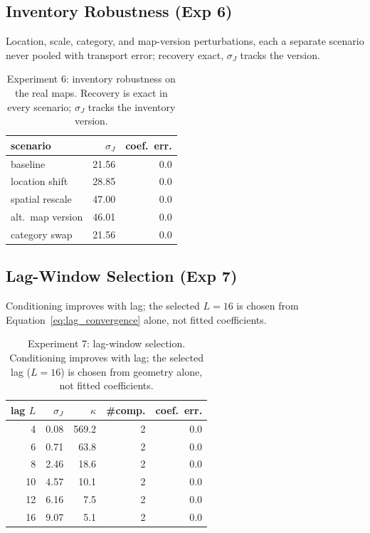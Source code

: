 \subsection{Inventory Robustness (Exp 6)}
\label{subsec:results_h5b}
Location, scale, category, and map-version perturbations, each a separate scenario
never pooled with transport error; recovery exact, $\sigma_J$ tracks the version.
\begin{table}[t]
\centering
\footnotesize
\caption{Experiment 6: inventory robustness on the real maps. Recovery is exact in
every scenario; $\sigma_J$ tracks the inventory version.}
\label{tab:results_h5b}
\begin{tabular}{lrr}
\toprule
scenario & $\sigma_J$ & coef.\ err. \\
\midrule
baseline        & 21.56 & 0.0 \\
location shift   & 28.85 & 0.0 \\
spatial rescale  & 47.00 & 0.0 \\
alt.\ map version & 46.01 & 0.0 \\
category swap     & 21.56 & 0.0 \\
\bottomrule
\end{tabular}
\end{table}

\subsection{Lag-Window Selection (Exp 7)}
\label{subsec:results_lag_selection}
Conditioning improves with lag; the selected $L=16$ is chosen from
Equation~\ref{eq:lag_convergence} alone, not fitted coefficients.
\begin{table}[t]
\centering
\footnotesize
\caption{Experiment 7: lag-window selection. Conditioning improves with lag; the
selected lag ($L=16$) is chosen from geometry alone, not fitted coefficients.}
\label{tab:results_lag}
\begin{tabular}{rrrrr}
\toprule
lag $L$ & $\sigma_J$ & $\kappa$ & \#comp. & coef.\ err. \\
\midrule
4  & 0.08 & 569.2 & 2 & 0.0 \\
6  & 0.71 & 63.8  & 2 & 0.0 \\
8  & 2.46 & 18.6  & 2 & 0.0 \\
10 & 4.57 & 10.1  & 2 & 0.0 \\
12 & 6.16 & 7.5   & 2 & 0.0 \\
16 & 9.07 & 5.1   & 2 & 0.0 \\
\bottomrule
\end{tabular}
\end{table}

